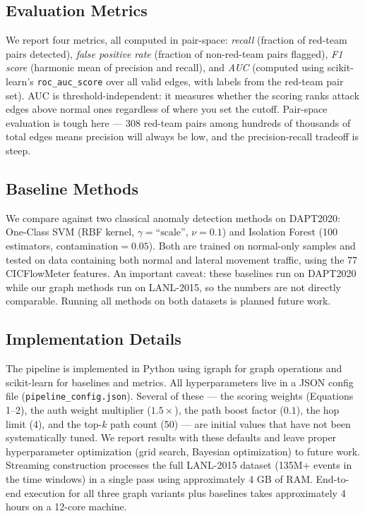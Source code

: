 \subsection{Evaluation Metrics}

We report four metrics, all computed in pair-space: \emph{recall} (fraction of red-team pairs detected), \emph{false positive rate} (fraction of non-red-team pairs flagged), \emph{F1 score} (harmonic mean of precision and recall), and \emph{AUC} (computed using scikit-learn's \texttt{roc\_auc\_score} over all valid edges, with labels from the red-team pair set). AUC is threshold-independent: it measures whether the scoring ranks attack edges above normal ones regardless of where you set the cutoff. Pair-space evaluation is tough here --- 308 red-team pairs among hundreds of thousands of total edges means precision will always be low, and the precision-recall tradeoff is steep.

\subsection{Baseline Methods}

We compare against two classical anomaly detection methods on DAPT2020: One-Class SVM (RBF kernel, $\gamma{=}\text{``scale''}$, $\nu{=}0.1$) and Isolation Forest (100 estimators, contamination$= 0.05$). Both are trained on normal-only samples and tested on data containing both normal and lateral movement traffic, using the 77 CICFlowMeter features. An important caveat: these baselines run on DAPT2020 while our graph methods run on LANL-2015, so the numbers are not directly comparable. Running all methods on both datasets is planned future work.

\subsection{Implementation Details}

The pipeline is implemented in Python using igraph for graph operations and scikit-learn for baselines and metrics. All hyperparameters live in a JSON config file (\texttt{pipeline\_config.json}). Several of these --- the scoring weights (Equations 1--2), the auth weight multiplier ($1.5\times$), the path boost factor ($0.1$), the hop limit (4), and the top-$k$ path count (50) --- are initial values that have not been systematically tuned. We report results with these defaults and leave proper hyperparameter optimization (grid search, Bayesian optimization) to future work. Streaming construction processes the full LANL-2015 dataset (135M+ events in the time windows) in a single pass using approximately 4 GB of RAM. End-to-end execution for all three graph variants plus baselines takes approximately 4 hours on a 12-core machine.
